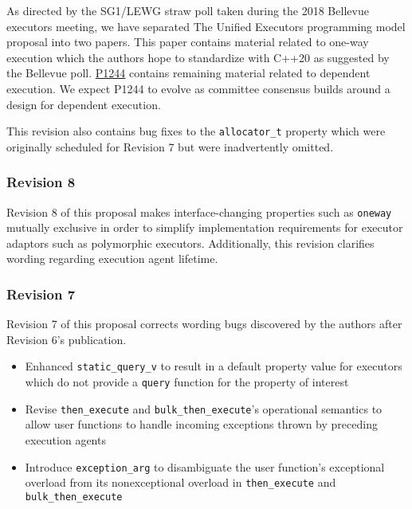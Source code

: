 \documentclass[a4paper,12pt,notitlepage,twoside,openright]{article}
\begin{document}
As directed by the SG1/LEWG straw poll taken during the 2018 Bellevue
executors meeting, we have separated The Unified Executors programming
model proposal into two papers. This paper contains material related to
one-way execution which the authors hope to standardize with C++20 as
suggested by the Bellevue poll. \href{http://wg21.link/P1244}{P1244}
contains remaining material related to dependent execution. We expect
P1244 to evolve as committee consensus builds around a design for
dependent execution.

This revision also contains bug fixes to the
\texttt{allocator_t} property which were originally
scheduled for Revision 7 but were inadvertently omitted.

\hypertarget{revision-8}{%
\subsubsection{Revision 8}\label{revision-8}}

Revision 8 of this proposal makes interface-changing properties such as
\texttt{oneway} mutually exclusive in order to simplify
implementation requirements for executor adaptors such as polymorphic
executors. Additionally, this revision clarifies wording regarding
execution agent lifetime.

\hypertarget{revision-7}{%
\subsubsection{Revision 7}\label{revision-7}}

Revision 7 of this proposal corrects wording bugs discovered by the
authors after Revision 6's publication.

\begin{itemize}

\item
  Enhanced \texttt{static_query_v} to result in a default
  property value for executors which do not provide a
  \texttt{query} function for the property of interest
\item
  Revise \texttt{then_execute} and
  \texttt{bulk_then_execute}'s operational semantics to
  allow user functions to handle incoming exceptions thrown by preceding
  execution agents
\item
  Introduce \texttt{exception_arg} to disambiguate the user
  function's exceptional overload from its nonexceptional overload in
  \texttt{then_execute} and
  \texttt{bulk_then_execute}
\end{itemize}
\end{document}
